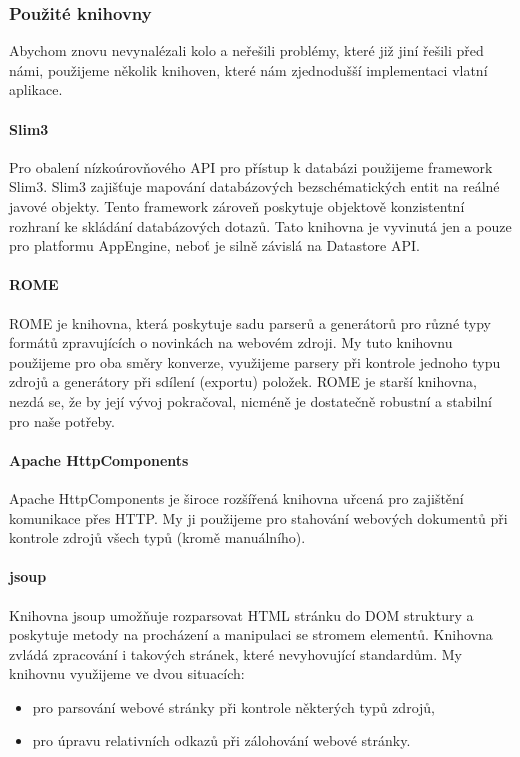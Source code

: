 \subsubsection{Použité knihovny}

Abychom znovu nevynalézali kolo a neřešili problémy, které již jiní řešili před námi, použijeme několik knihoven, které nám zjednodušší implementaci vlatní aplikace.

\paragraph{Slim3}
Pro obalení nízkoúrovňového API pro přístup k databázi použijeme framework Slim3.
Slim3 zajišťuje mapování databázových bezschématických entit na reálné javové objekty.
Tento framework zároveň poskytuje objektově konzistentní rozhraní ke skládání databázových dotazů.
Tato knihovna je vyvinutá jen a pouze pro platformu AppEngine, neboť je silně závislá na Datastore API.

\paragraph{ROME}
ROME je knihovna, která poskytuje sadu parserů a generátorů pro různé typy formátů zpravujících o novinkách na webovém zdroji.
My tuto knihovnu použijeme pro oba směry konverze, využijeme parsery při kontrole jednoho typu zdrojů a generátory při sdílení (exportu) položek.
ROME je starší knihovna, nezdá se, že by její vývoj pokračoval, nicméně je dostatečně robustní a stabilní pro naše potřeby.

\paragraph{Apache HttpComponents}
Apache HttpComponents je široce rozšířená knihovna uřcená pro zajištění komunikace přes HTTP.
My ji použijeme pro stahování webových dokumentů při kontrole zdrojů všech typů (kromě manuálního).

\paragraph{jsoup}
Knihovna jsoup umožňuje rozparsovat HTML stránku do DOM struktury a poskytuje metody na procházení a manipulaci se stromem elementů.
Knihovna zvládá zpracování i takových stránek, které nevyhovující standardům.
My knihovnu využijeme ve dvou situacích:
\begin{itemize}
	\item pro parsování webové stránky při kontrole některých typů zdrojů,
	\item pro úpravu relativních odkazů při zálohování webové stránky.
\end{itemize}

